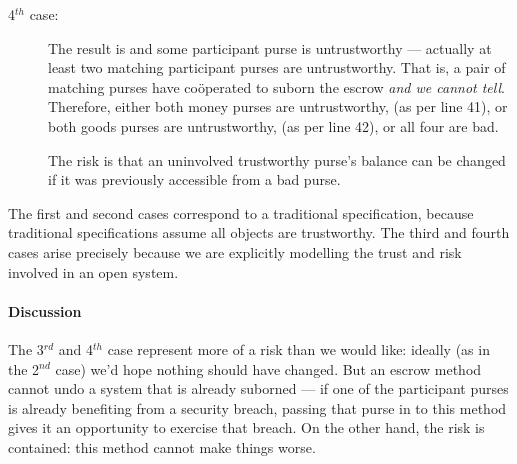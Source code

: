 \begin{description}
\item [4$^{th}$ case:]  The result is   and some participant
  purse is untrustworthy --- actually at least two
  matching participant purses are untrustworthy.
  That is, a pair of matching purses
  have co{\"o}perated to
  suborn the escrow \textit{and we cannot tell}.
 Therefore, either both money purses are untrustworthy,
 (as per line 41),  %
or both goods purses are untrustworthy,
 (as per line 42),
%
%
%
%
%
%
%
or all four are bad. %

The risk is that an uninvolved trustworthy purse's balance can be
changed if it was previously accessible from a bad purse.

\end{description}

\noindent The first and second cases correspond to a traditional
specification, because traditional specifications assume all objects
are trustworthy.  The third and fourth cases arise precisely because
we are explicitly modelling the trust and risk involved in an open
system.

\paragraph{Discussion} The 3$^{rd}$  and 4$^{th}$ case represent  more
of a risk than we would like: ideally (as
  in the 2$^{nd}$ case) we'd hope nothing should have changed. But an
  escrow method cannot undo a system that is already suborned --- if
  one of the participant purses is already benefiting from a security
  breach, passing that purse in to this method gives it an opportunity
  to exercise that breach.  On the other hand, the risk is contained:
  this method cannot make things worse.
%

